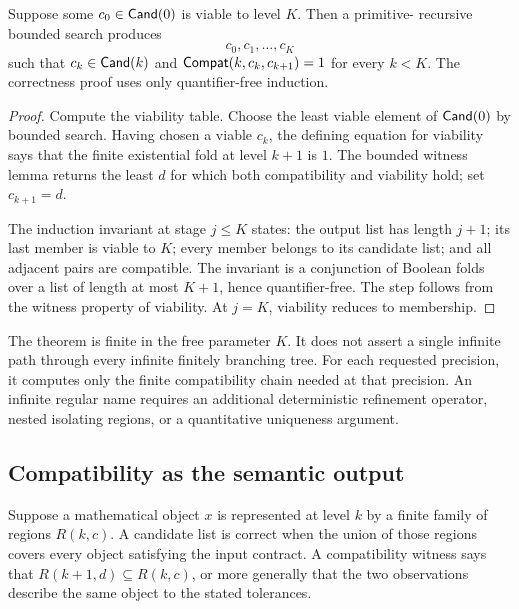 \begin{theorem}
Suppose some \(c_0\in\mathsf{Cand}(0)\) is viable to level \(K\).  Then a primitive-
recursive bounded search produces
\[
    c_0,c_1,\ldots,c_K
\]
such that \(c_k\in\mathsf{Cand}(k)\) and
\(\mathsf{Compat}(k,c_k,c_{k+1})=1\) for every \(k<K\).
The correctness proof uses only quantifier-free induction.
\end{theorem}

\begin{proof}
Compute the viability table.  Choose the least viable element of
\(\mathsf{Cand}(0)\) by bounded search.  Having chosen a viable \(c_k\), the defining
equation for viability says that the finite existential fold at level
\(k+1\) is \(1\).  The bounded witness lemma returns the least \(d\) for
which both compatibility and viability hold; set \(c_{k+1}=d\).

The induction invariant at stage \(j\le K\) states:
the output list has length \(j+1\); its last member is viable to \(K\);
every member belongs to its candidate list; and all adjacent pairs are
compatible.  The invariant is a conjunction of Boolean folds over a list of
length at most \(K+1\), hence quantifier-free.  The step follows from the
witness property of viability.  At \(j=K\), viability reduces to membership.
\end{proof}

\begin{remark}
The theorem is finite in the free parameter \(K\).  It does not assert a
single infinite path through every infinite finitely branching tree.  For
each requested precision, it computes only the finite compatibility chain
needed at that precision.  An infinite regular name requires an additional
deterministic refinement operator, nested isolating regions, or a quantitative
uniqueness argument.
\end{remark}

\subsection{Compatibility as the semantic output}

Suppose a mathematical object \(x\) is represented at level \(k\) by a finite
family of regions \(R(k,c)\).  A candidate list is correct when the union of
those regions covers every object satisfying the input contract.  A
compatibility witness says that \(R(k+1,d)\subseteq R(k,c)\), or more
generally that the two observations describe the same object to the stated
tolerances.

